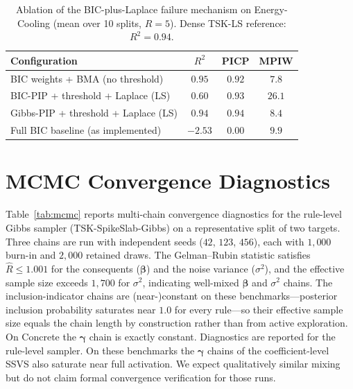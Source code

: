 \documentclass[review,1p,times]{elsarticle}
\begin{document}
\begin{table}[htbp]
\centering
\caption{Ablation of the BIC-plus-Laplace failure mechanism on Energy-Cooling (mean over 10 splits, $R=5$). Dense TSK-LS reference: $R^2=0.94$.}
\label{tab:ablation}
\footnotesize
\begin{tabular}{lccc}
\toprule
Configuration & $R^2$ & PICP & MPIW \\
\midrule
BIC weights + BMA (no threshold)     & $0.95$ & $0.92$ & $7.8$ \\
BIC-PIP + threshold + Laplace (LS)   & $0.60$ & $0.93$ & $26.1$ \\
Gibbs-PIP + threshold + Laplace (LS) & $0.94$ & $0.94$ & $8.4$ \\
Full BIC baseline (as implemented)   & $-2.53$ & $0.00$ & $9.9$ \\
\bottomrule
\end{tabular}
\end{table}

\FloatBarrier

\section{MCMC Convergence Diagnostics}

Table~\ref{tab:mcmc} reports multi-chain convergence diagnostics for the rule-level Gibbs sampler (TSK-SpikeSlab-Gibbs) on a representative split of two targets. Three chains are run with independent seeds ($42$, $123$, $456$), each with $1{,}000$ burn-in and $2{,}000$ retained draws. The Gelman--Rubin statistic satisfies $\hat{R}\le1.001$ for the consequents ($\boldsymbol{\beta}$) and the noise variance ($\sigma^2$), and the effective sample size exceeds $1{,}700$ for $\sigma^2$, indicating well-mixed $\boldsymbol{\beta}$ and $\sigma^2$ chains.
The inclusion-indicator chains are (near-)constant on these benchmarks---posterior inclusion probability saturates near $1.0$ for every rule---so their effective sample size equals the chain length by construction rather than from active exploration.
On Concrete the $\boldsymbol{\gamma}$ chain is exactly constant.
Diagnostics are reported for the rule-level sampler.
On these benchmarks the $\boldsymbol{\gamma}$ chains of the coefficient-level SSVS also saturate near full activation.
We expect qualitatively similar mixing but do not claim formal convergence verification for those runs.
\end{document}
